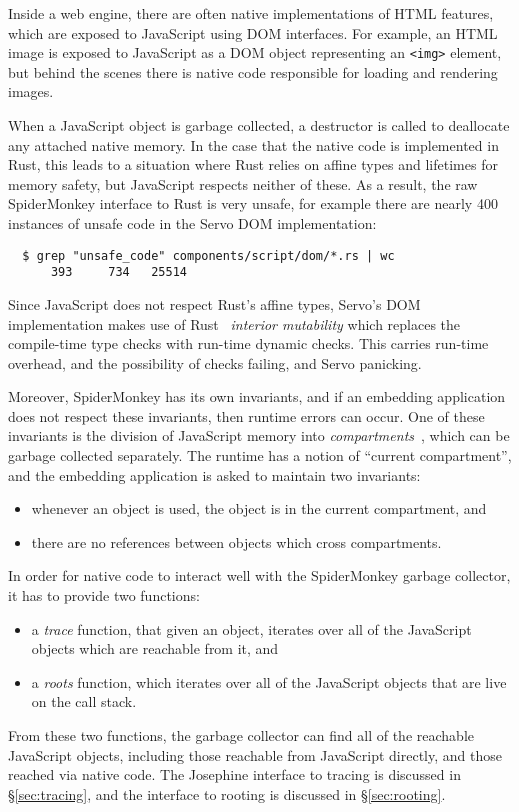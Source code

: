 Inside a web engine, there are often native implementations of HTML features,
which are exposed to JavaScript using DOM interfaces. For example, an HTML image
is exposed to JavaScript as a DOM object representing an \verb|<img>| element,
but behind the scenes there is native code responsible for loading and rendering
images.

When a JavaScript object is garbage collected, a destructor is called to
deallocate any attached native memory. In the case that the native code
is implemented in Rust, this leads to a situation where Rust relies on affine
types and lifetimes for memory safety, but JavaScript respects neither of these.
As a result, the raw SpiderMonkey interface to Rust is very unsafe,
for example there are nearly 400 instances of unsafe code in the Servo
DOM implementation:
\begin{verbatim}
  $ grep "unsafe_code" components/script/dom/*.rs | wc
      393     734   25514
\end{verbatim}
Since JavaScript does not respect Rust's affine types,
Servo's DOM implementation makes use of Rust~\cite[\S3.11]{rust}
\emph{interior mutability} which replaces the compile-time type
checks with run-time dynamic checks. This carries run-time overhead,
and the possibility of checks failing, and Servo panicking.

Moreover, SpiderMonkey has its own invariants, and if an embedding
application does not respect these invariants, then runtime errors can
occur. One of these invariants is the division of JavaScript memory
into \emph{compartments}~\cite{compartments}, which can be garbage collected
separately. The runtime has a notion of ``current compartment'',
and the embedding application is asked to maintain two invariants:
\begin{itemize}
  \item whenever an object is used, the object is in the current compartment, and
  \item there are no references between objects which cross compartments.
\end{itemize}
In order for native code to interact well with the SpiderMonkey garbage collector,
it has to provide two functions:
\begin{itemize}
\item a \emph{trace} function, that given an object, iterates over all of the
  JavaScript objects which are reachable from it, and
\item a \emph{roots} function, which iterates over all of the JavaScript
  objects that are live on the call stack.
\end{itemize}
From these two functions, the garbage collector can find all of the reachable
JavaScript objects, including those reachable from JavaScript directly, and
those reached via native code. The Josephine interface to tracing
is discussed in \S\ref{sec:tracing}, and the interface to rooting
is discussed in \S\ref{sec:rooting}.

